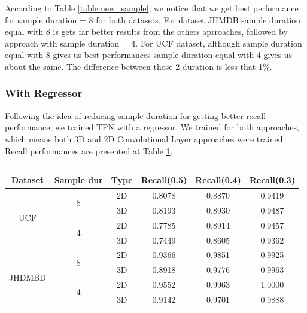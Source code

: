 According to Table \ref{table:new_sample}, we notice that we get best performance for sample duration = 8 for both datasets. For dataset JHMDB sample duration equal with 8
is gets far better results from the others aprroaches, followed by approach with sample duration = 4. For UCF dataset, although sample duration equal with 8 gives us best performances
sample duration equal with 4 gives us about the same. The difference between those 2 duration is less that 1\%. 

\subsubsection{With Regressor}                                             

Following the idea of reducing sample duration for getting better recall performance, we trained TPN with a regressor. We trained for both approaches, which means both 3D and 2D Convolutional
Layer approaches were trained. Recall performances are presented at Table \ref{table:new_sample_reg}.

\begin{table}[h]
  \centering
  \begin{tabular}{|c | c | c || c c c|}
    \hline
    \textbf{Dataset} & \textbf{Sample dur} & \textbf{Type} & \textbf{Recall(0.5)} &  \textbf{Recall(0.4)} &  \textbf{Recall(0.3)} \\
    \hline
    \multirow{4}{*}{UCF} & \multirow{2}{*}{8} & 2D & 0.8078 & 0.8870 & 0.9419 \\
    \cline{3-6}
    {} & {} & 3D & 0.8193 & 0.8930 & 0.9487 \\
    \cline{2-6}
    {} & \multirow{2}{*}{4}& 2D & 0.7785 & 0.8914 & 0.9457 \\
    \cline{3-6}
    {} & {} & 3D & 0.7449 & 0.8605 & 0.9362 \\
    \hline
    \multirow{4}{*}{JHDMBD} & \multirow{2}{*}{8} & 2D &  0.9366 & 0.9851 & 0.9925  \\
    \cline{3-6}
    {} & {} & 3D & 0.8918 & 0.9776 & 0.9963  \\ 
    \cline{2-6}
    {} & \multirow{2}{*}{4}& 2D & 0.9552 & 0.9963 & 1.0000 \\
    \cline{3-6}
    {} & {} & 3D & 0.9142 & 0.9701 & 0.9888  \\
    \hline
    
  \end{tabular}
  \caption{}
  \label{table:new_sample_reg}
\end{table}

